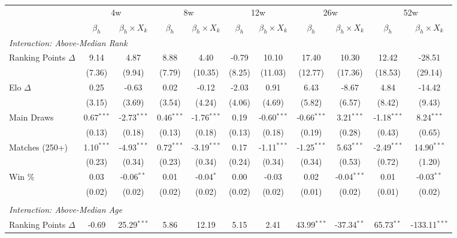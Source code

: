 \begin{tabular}{lcccccccccc}
\toprule
  & \multicolumn{2}{c}{4w} & \multicolumn{2}{c}{8w} & \multicolumn{2}{c}{12w} & \multicolumn{2}{c}{26w} & \multicolumn{2}{c}{52w} \\
\cmidrule(lr){2-3} \cmidrule(lr){4-5} \cmidrule(lr){6-7} \cmidrule(lr){8-9} \cmidrule(lr){10-11} 
  & $\beta_h$ & $\beta_h \times X_k$ & $\beta_h$ & $\beta_h \times X_k$ & $\beta_h$ & $\beta_h \times X_k$ & $\beta_h$ & $\beta_h \times X_k$ & $\beta_h$ & $\beta_h \times X_k$ \\
\midrule
\multicolumn{11}{l}{\textit{Interaction: Above-Median Rank}} \\
\quad Ranking Points $\Delta$ & 9.14 & 4.87 & 8.88 & 4.40 & -0.79 & 10.10 & 17.40 & 10.30 & 12.42 & -28.51 \\
 & (7.36) & (9.94) & (7.79) & (10.35) & (8.25) & (11.03) & (12.77) & (17.36) & (18.53) & (29.14) \\[0.3em]
\quad Elo $\Delta$ & 0.25 & -0.63 & 0.02 & -0.12 & -2.03 & 0.91 & 6.43 & -8.67 & 4.84 & -14.42 \\
 & (3.15) & (3.69) & (3.54) & (4.24) & (4.06) & (4.69) & (5.82) & (6.57) & (8.42) & (9.43) \\[0.3em]
\quad Main Draws & 0.67$^{***}$ & -2.73$^{***}$ & 0.46$^{***}$ & -1.76$^{***}$ & 0.19 & -0.60$^{***}$ & -0.66$^{***}$ & 3.21$^{***}$ & -1.18$^{***}$ & 8.24$^{***}$ \\
 & (0.13) & (0.18) & (0.13) & (0.18) & (0.13) & (0.18) & (0.19) & (0.28) & (0.43) & (0.65) \\[0.3em]
\quad Matches (250+) & 1.10$^{***}$ & -4.93$^{***}$ & 0.72$^{***}$ & -3.19$^{***}$ & 0.17 & -1.11$^{***}$ & -1.25$^{***}$ & 5.63$^{***}$ & -2.49$^{***}$ & 14.90$^{***}$ \\
 & (0.23) & (0.34) & (0.23) & (0.34) & (0.24) & (0.34) & (0.34) & (0.53) & (0.72) & (1.20) \\[0.3em]
\quad Win \% & 0.03 & -0.06$^{**}$ & 0.01 & -0.04$^{*}$ & 0.00 & -0.03 & 0.02 & -0.04$^{***}$ & 0.01 & -0.03$^{**}$ \\
 & (0.02) & (0.02) & (0.02) & (0.02) & (0.02) & (0.02) & (0.01) & (0.02) & (0.01) & (0.02) \\[0.3em]
\\[0.3em]
\multicolumn{11}{l}{\textit{Interaction: Above-Median Age}} \\
\quad Ranking Points $\Delta$ & -0.69 & 25.29$^{***}$ & 5.86 & 12.19 & 5.15 & 2.41 & 43.99$^{***}$ & -37.34$^{**}$ & 65.73$^{**}$ & -133.11$^{***}$ \\

\end{tabular}
